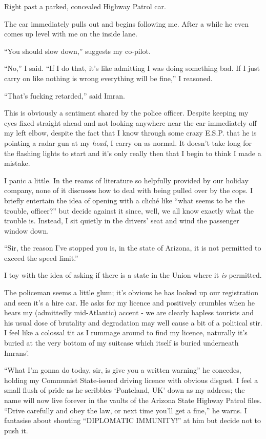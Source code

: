 \documentclass[a5paper,titlepage,11pt]{book}
\begin{document}
Right past a parked, concealed Highway Patrol car.

The car immediately pulls out and begins following me. After a while he even comes up level with me on the inside lane.

``You should slow down,'' suggests my co-pilot.

``No,'' I said. ``If I do that, it's like admitting I was doing something bad. If I just carry on like nothing is wrong everything will be fine,'' I reasoned.

``That's fucking retarded,'' said Imran.

This is obviously a sentiment shared by the police officer. Despite keeping my eyes fixed straight ahead and not looking anywhere near the car immediately off my left elbow, despite the fact that I know through some crazy E.S.P. that he is pointing a radar gun at my \emph{head}, I carry on as normal. It doesn't take long for the flashing lights to start and it's only really then that I begin to think I made a mistake.

I panic a little. In the reams of literature so helpfully provided by our holiday company, none of it discusses how to deal with being pulled over by the cops. I briefly entertain the idea of opening with a clich\'{e} like ``what seems to be the trouble, officer?'' but decide against it since, well, we all know exactly what the trouble is. Instead, I sit quietly in the drivers' seat and wind the passenger window down.

``Sir, the reason I've stopped you is, in the state of Arizona, it is not permitted to exceed the speed limit.''

I toy with the idea of asking if there is a state in the Union where it \emph{is} permitted.

The policeman seems a little glum; it's obvious he has looked up our registration and seen it's a hire car. He asks for my licence and positively crumbles when he hears my (admittedly mid-Atlantic) accent - we are clearly hapless tourists and his usual dose of brutality and degradation may well cause a bit of a political stir. I feel like a colossal tit as I rummage around to find my licence, naturally it's buried at the very bottom of my suitcase which itself is buried underneath Imrans'.

``What I'm gonna do today, sir, is give you a written warning'' he concedes, holding my Communist State-issued driving licence with obvious disgust. I feel a small flush of pride as he scribbles `Ponteland, UK' down as my address; the name will now live forever in the vaults of the Arizona State Highway Patrol files. ``Drive carefully and obey the law, or next time you'll get a fine,'' he warns. I fantasise about shouting ``DIPLOMATIC IMMUNITY!'' at him but decide not to push it.
\end{document}
